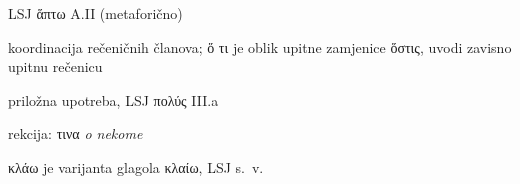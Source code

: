 
\begin{description}[noitemsep]
\item[ἥψατο] LSJ ἅπτω A.II (metaforično)
\end{description}



\begin{description}[noitemsep]
\item[Ὅ τι μὲν\dots\ ἄση δὲ\dots] koordinacija rečeničnih članova; ὅ τι je oblik upitne zamjenice ὅστις, uvodi zavisno upitnu rečenicu
\item[πολλά] priložna upotreba, LSJ πολύς III.a
\item[ἐλάλει] rekcija: τινα \textit{o nekome}
\item[ἔκλαεν] κλάω je varijanta glagola κλαίω, LSJ s.~v.
\end{description}


